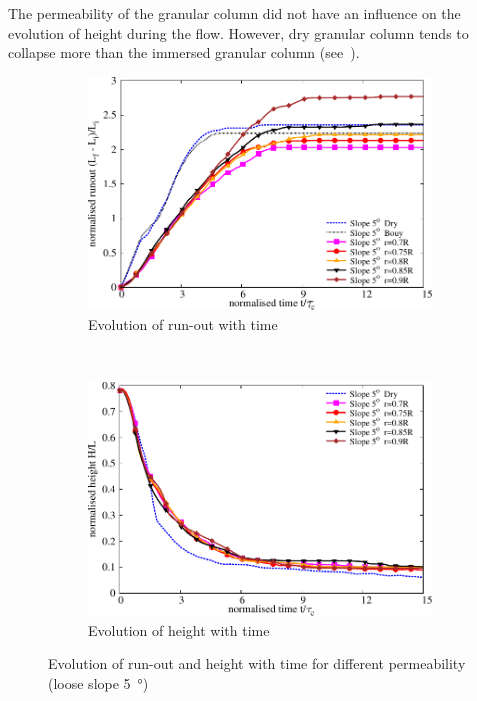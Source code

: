 The permeability of the granular column did not have an influence on the evolution of height during the flow. However, dry granular column tends to collapse more than the immersed granular column (see~).

\begin{figure}
\centering
\begin{subfigure}[b]{0.95\textwidth}
\centering
\includegraphics[width=0.95\columnwidth]{Runout_loose_5_slope}
\caption{Evolution of run-out with time}
\label{fig:run5}
\end{subfigure}\\
\begin{subfigure}[b]{0.95\textwidth}
\centering
\includegraphics[width=0.95\columnwidth]{Height_loose_5_slope}
\caption{Evolution of height with time}
\label{fig:height5}
\end{subfigure}
\caption{Evolution of run-out and height with time for different permeability 
(loose slope \SI{5}{\degree})}
\label{fig:height_run_5}
\end{figure}

